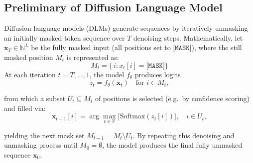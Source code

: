 \subsection{Preliminary of Diffusion Language Model}\label{sec:preliminary}

Diffusion language models (DLMs) generate sequences by iteratively unmasking an initially masked token sequence over \(T\) denoising steps. Mathematically, let \(\mathbf{x}_T\in\mathbb{N}^L\) be the fully masked input (all positions set to $\texttt{[MASK]}$), where the still masked position $M_t$ is represented as:
\begin{equation}
M_t = \bigl\{\,i : x_t[i] = \texttt{[MASK]}\bigr\}
\end{equation}
At each iteration \(t=T,\dots,1\), the model \(f_\theta\) produces logits
\begin{equation}
z_t = f_\theta(\mathbf{x}_t)\quad\text{for }i\in M_t,
\end{equation}

from which a subset \(U_t\subseteq M_t\) of positions is selected (e.g.\ by confidence scoring) and filled via: 
\begin{equation}
\mathbf{x}_{t-1}[i]
= \arg\max_{v\in\mathcal V}\bigl[\mathrm{Softmax}(z_t[i])\bigr],\quad i\in U_t,
\end{equation}

yielding the next mask set \(M_{t-1}=M_t\setminus U_t\).  By repeating this denoising and unmasking process until \(M_0=\emptyset\), the model produces the final fully unmasked sequence \(\mathbf{x}_0\).


